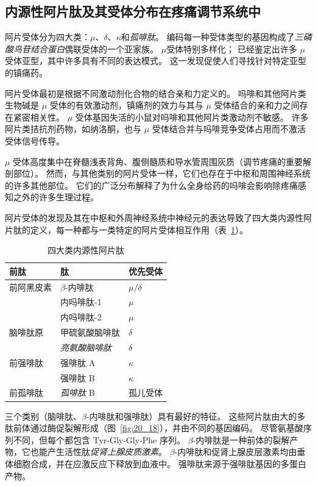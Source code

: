 \subsection{内源性阿片肽及其受体分布在疼痛调节系统中}

阿片受体分为四大类：$\mu$、$ \delta $、$ \kappa $和\textit{孤啡肽}。
编码每一种受体类型的基因构成了\textit{三磷酸鸟苷结合蛋白}偶联受体的一个亚家族。
$\mu$受体特别多样化；
已经鉴定出许多 $\mu$ 受体亚型，其中许多具有不同的表达模式。
这一发现促使人们寻找针对特定亚型的镇痛药。


阿片受体最初是根据不同激动剂化合物的结合亲和力定义的。
吗啡和其他阿片类生物碱是 $\mu$ 受体的有效激动剂，镇痛剂的效力与其与 $\mu$ 受体结合的亲和力之间存在紧密相关性。
$\mu$ 受体基因失活的小鼠对吗啡和其他阿片类激动剂不敏感。
许多阿片类拮抗剂药物，如纳洛酮，也与 $\mu$ 受体结合并与吗啡竞争受体占用而不激活受体信号传导。


$\mu$ 受体高度集中在脊髓浅表背角、腹侧髓质和导水管周围灰质（调节疼痛的重要解剖部位）。
然而，与其他类别的阿片受体一样，它们也存在于中枢和周围神经系统的许多其他部位。
它们的广泛分布解释了为什么全身给药的吗啡会影响除疼痛感知之外的许多生理过程。


阿片受体的发现及其在中枢和外周神经系统中神经元的表达导致了四大类内源性阿片肽的定义，每一种都与一类特定的阿片受体相互作用（表~\ref{tab:20_1}）。


\begin{table}[htbp]
	\caption{四大类内源性阿片肽} \label{tab:20_1} \centering
	\begin{tabular}{lll}
		\toprule
		前肽 & 肽 & 优先受体 \\
		\midrule
		前阿黑皮素 & $\beta$-内啡肽 & $\mu / \delta$  \\
		 & 内吗啡肽-1 & $\mu$  \\
		 & 内吗啡肽-2 & $\mu$  \\
		脑啡肽原 & 甲硫氨酸脑啡肽 & $\delta$  \\
		 & \textit{亮氨酸脑啡肽} & $\delta$  \\
		前强啡肽 & 强啡肽 A & $\kappa$  \\
		 & 强啡肽 B & $\kappa$  \\
		前孤啡肽 & \textit{孤啡肽} B & 孤儿受体  \\
		\bottomrule
	\end{tabular}
\end{table}


三个类别（脑啡肽、$ \beta $-内啡肽和强啡肽）具有最好的特征。
这些阿片肽由大的多肽前体通过酶促裂解形成（图~\ref{fig:20_18}），并由不同的基因编码。
尽管氨基酸序列不同，但每个都包含 Tyr-Gly-Gly-Phe 序列。
$ \beta $-内啡肽是一种前体的裂解产物，它也能产生活性肽\textit{促肾上腺皮质激素}。
$ \beta $-内啡肽和促肾上腺皮层激素均由垂体细胞合成，并在应激反应下释放到血液中。
强啡肽来源于强啡肽基因的多蛋白产物。


